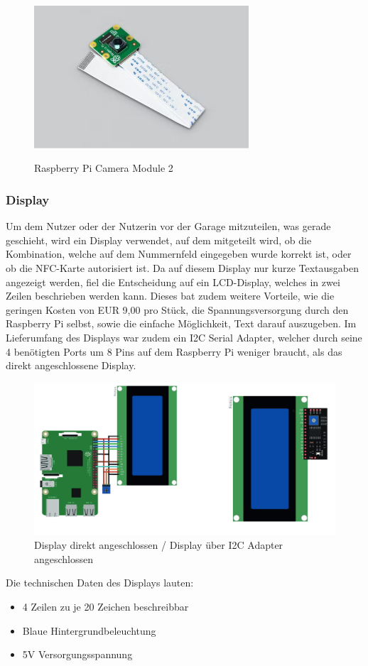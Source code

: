 \begin{figure}[H]
  \centering
  \includegraphics[width=8cm]{pics/RaspberryPiCameraModule2.jpg}
  \caption{Raspberry Pi Camera Module 2}
  \cite{PiCamera}
\end{figure}

\subsubsection{Display}
Um dem Nutzer oder der Nutzerin vor der Garage mitzuteilen, was gerade geschieht, wird ein Display verwendet, auf dem mitgeteilt wird, ob die Kombination, welche auf dem Nummernfeld eingegeben wurde korrekt ist, oder ob die NFC-Karte autorisiert ist.
Da auf diesem Display nur kurze Textausgaben angezeigt werden, fiel die Entscheidung auf ein LCD-Display, welches in zwei Zeilen beschrieben werden kann. Dieses bat zudem weitere Vorteile, wie die geringen Kosten von EUR 9,00 pro Stück, die Spannungsversorgung durch den Raspberry Pi selbst, sowie die einfache Möglichkeit, Text darauf auszugeben.
Im Lieferumfang des Displays war zudem ein I2C Serial Adapter, welcher durch seine 4 benötigten Ports um 8 Pins auf dem Raspberry Pi weniger braucht, als das direkt angeschlossene Display.
\cite{DifferentConnectionTypesDisplay}
\begin{figure}[H]
  \centering
  \includegraphics[width=15cm]{pics/DisplayComparison.jpg}
  \caption{Display direkt angeschlossen / Display über I2C Adapter angeschlossen}
\end{figure}
Die technischen Daten des Displays lauten:
\begin{itemize}
  \item 4 Zeilen zu je 20 Zeichen beschreibbar
  \item Blaue Hintergrundbeleuchtung
  \item 5V Versorgungsspannung
\end{itemize}
\cite{RaspberryDisplay}

